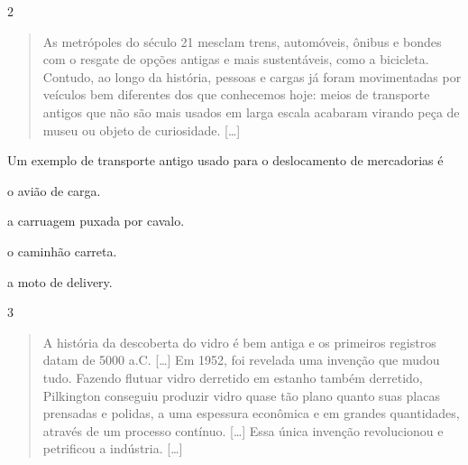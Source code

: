 \num{2}
\enlargethispage{3\baselineskip}

\begin{quote}
As metrópoles do século 21 mesclam trens, automóveis, ônibus e bondes
com o resgate de opções antigas e mais sustentáveis, como a bicicleta.
Contudo, ao longo da história, pessoas e cargas já foram movimentadas
por veículos bem diferentes dos que conhecemos hoje: meios de transporte
antigos que não são mais usados em larga escala acabaram virando peça de
museu ou objeto de curiosidade. {[}\ldots{}{]}
\end{quote}

\pagebreak

Um exemplo de transporte antigo usado para o deslocamento de mercadorias é

\begin{minipage}{0.5\textwidth}
\begin{escolha}
\item o avião de carga.

\item a carruagem puxada por cavalo.

\item o caminhão carreta.

\item a moto de delivery.
\end{escolha}
\end{minipage}


\num{3}

\begin{quote}
A história da descoberta do vidro é bem antiga e os primeiros
registros datam de 5000 a.C. {[}\ldots{}{]} Em 1952, foi revelada uma invenção que
mudou tudo. Fazendo flutuar vidro derretido em estanho também derretido,
Pilkington conseguiu produzir vidro quase tão plano quanto suas placas
prensadas e polidas, a uma espessura econômica e em grandes quantidades,
através de um processo contínuo. {[}\ldots{}{]} Essa única invenção revolucionou e
petrificou a indústria. {[}\ldots{}{]}

\end{quote}


